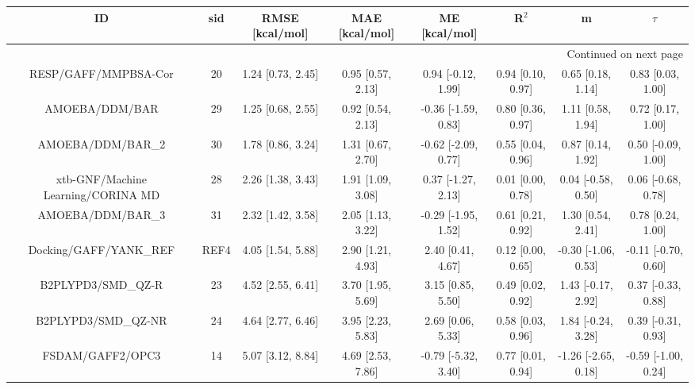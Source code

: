 \documentclass[8pt]{article}
\begin{document}
\begin{center}
\begin{footnotesize}
\begin{longtable}{|cccccccc|}
\toprule
                                 ID &   sid &       RMSE [kcal/mol] &        MAE [kcal/mol] &         ME [kcal/mol] &              R$^2$ &                    m &               $\tau$ \\
\midrule
\endhead
\midrule
\multicolumn{8}{r}{{Continued on next page}} \\
\midrule
\endfoot

\bottomrule
\endlastfoot
               RESP/GAFF/MMPBSA-Cor &    20 &     1.24 [0.73, 2.45] &     0.95 [0.57, 2.13] &    0.94 [-0.12, 1.99] &  0.94 [0.10, 0.97] &    0.65 [0.18, 1.14] &    0.83 [0.03, 1.00] \\
                     AMOEBA/DDM/BAR &    29 &     1.25 [0.68, 2.55] &     0.92 [0.54, 2.13] &   -0.36 [-1.59, 0.83] &  0.80 [0.36, 0.97] &    1.11 [0.58, 1.94] &    0.72 [0.17, 1.00] \\
                  AMOEBA/DDM/BAR\_2 &    30 &     1.78 [0.86, 3.24] &     1.31 [0.67, 2.70] &   -0.62 [-2.09, 0.77] &  0.55 [0.04, 0.96] &    0.87 [0.14, 1.92] &   0.50 [-0.09, 1.00] \\
 xtb-GNF/Machine Learning/CORINA MD &    28 &     2.26 [1.38, 3.43] &     1.91 [1.09, 3.08] &    0.37 [-1.27, 2.13] &  0.01 [0.00, 0.78] &   0.04 [-0.58, 0.50] &   0.06 [-0.68, 0.78] \\
                  AMOEBA/DDM/BAR\_3 &    31 &     2.32 [1.42, 3.58] &     2.05 [1.13, 3.22] &   -0.29 [-1.95, 1.52] &  0.61 [0.21, 0.92] &    1.30 [0.54, 2.41] &    0.78 [0.24, 1.00] \\
             Docking/GAFF/YANK\_REF &  REF4 &     4.05 [1.54, 5.88] &     2.90 [1.21, 4.93] &     2.40 [0.41, 4.67] &  0.12 [0.00, 0.65] &  -0.30 [-1.06, 0.53] &  -0.11 [-0.70, 0.60] \\
                 B2PLYPD3/SMD\_QZ-R &    23 &     4.52 [2.55, 6.41] &     3.70 [1.95, 5.69] &     3.15 [0.85, 5.50] &  0.49 [0.02, 0.92] &   1.43 [-0.17, 2.92] &   0.37 [-0.33, 0.88] \\
                B2PLYPD3/SMD\_QZ-NR &    24 &     4.64 [2.77, 6.46] &     3.95 [2.23, 5.83] &     2.69 [0.06, 5.33] &  0.58 [0.03, 0.96] &   1.84 [-0.24, 3.28] &   0.39 [-0.31, 0.93] \\
                   FSDAM/GAFF2/OPC3 &    14 &     5.07 [3.12, 8.84] &     4.69 [2.53, 7.86] &   -0.79 [-5.32, 3.40] &  0.77 [0.01, 0.94] &  -1.26 [-2.65, 0.18] &  -0.59 [-1.00, 0.24] \\

\end{longtable}
\end{footnotesize}
\end{center}
\end{document}
